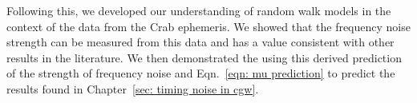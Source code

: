 \documentclass[../full_thesis/full_thesis.tex]{subfiles}
\begin{document}
{Following this, we developed our understanding of random walk models in the
context of the data from the Crab ephemeris. We showed that the frequency noise
strength can be measured from this data and has a value consistent with other
results in the literature. We then demonstrated the using this derived
prediction of the strength of frequency noise and Eqn.~\eqref{eqn: mu
prediction} to predict the results found in Chapter~\ref{sec: timing noise in
cgw}.


}
\end{document}

